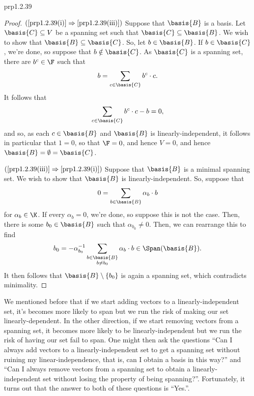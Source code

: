 \begin{prp}{}{prp1.2.39}
\begin{proof}
		\blni
		$(\cref{prp1.2.39(i)}\Rightarrow \cref{prp1.2.39(iii)})$ Suppose that $\basis{B}$ is a basis.  Let $\basis{C}\subseteq V$ be a spanning set such that $\basis{C}\subseteq \basis{B}$.  We wish to show that $\basis{B}\subseteq \basis{C}$.  So, let $b\in \basis{B}$.  If $b\in \basis{C}$, we're done, so suppose that $b\notin \basis{C}$.  As $\basis{C}$ is a spanning set, there are $b^c\in \F$ such that
		\begin{equation}
			b=\sum _{c\in \basis{C}}b^c\cdot c.
		\end{equation}
		It follows that
		\begin{equation}
			\sum _{c\in \basis{C}}b^c\cdot c-b=0,
		\end{equation}
		and so, as each $c\in \basis{B}$ and $\basis{B}$ is linearly-independent, it follows in particular that $1=0$, so that $\F =0$, and hence $V=0$, and hence $\basis{B}=\emptyset =\basis{C}$.
		
		\blni
		$(\cref{prp1.2.39(iii)}\Rightarrow \cref{prp1.2.39(i)})$ Suppose that $\basis{B}$ is a minimal spanning set.  We wish to show that $\basis{B}$ is linearly-independent.  So, suppose that
		\begin{equation}
			0=\sum _{b\in \basis{B}}\alpha _b\cdot b
		\end{equation}
		for $\alpha _b\in \K$.  If every $\alpha _b=0$, we're done, so suppose this is not the case.  Then, there is some $b_0\in \basis{B}$ such that $\alpha _{b_0}\neq 0$.  Then, we can rearrange this to find
		\begin{equation}
			b_0=-\alpha _{b_0}^{-1}\sum _{\substack{b\in \basis{B} \\ b\neq b_0}}\alpha _b\cdot b\in \Span (\basis{B}).
		\end{equation}
		It then follows that $\basis{B}\setminus \{ b_0\}$ is again a spanning set, which contradicts minimality.
	\end{proof}
\end{prp}
We mentioned before that if we start adding vectors to a linearly-independent set, it's becomes more likely to span but we run the risk of making our set linearly-dependent.  In the other direction, if we start removing vectors from a spanning set, it becomes more likely to be linearly-independent but we run the risk of having our set fail to span.  One might then ask the questions ``Can I always add vectors to a linearly-independent set to get a spanning set without ruining my linear-independence, that is, can I obtain a basis in this way?'' and ``Can I always remove vectors from a spanning set to obtain a linearly-independent set without losing the property of being spanning?''.  Fortunately, it turns out that the answer to both of these questions is ``Yes.''.
